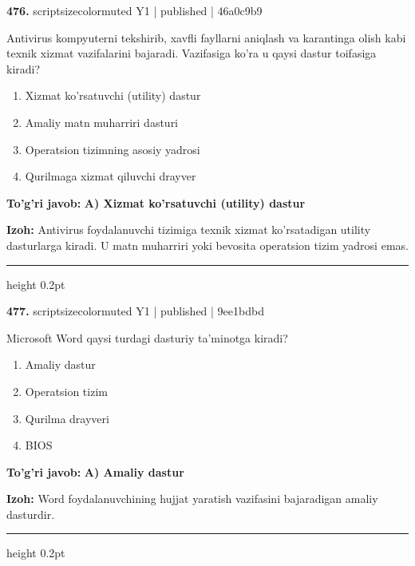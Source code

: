 \documentclass[10pt,a4paper]{article}
\begin{document}
{\bfseries\sffamily\color{ink} 476.} {scriptsizecolor{muted} Y1 | published | 46a0c9b9}
\par
Antivirus kompyuterni tekshirib, xavfli fayllarni aniqlash va karantinga olish kabi texnik xizmat vazifalarini bajaradi. Vazifasiga ko'ra u qaysi dastur toifasiga kiradi?
\begin{enumerate}[label=\Alph*),leftmargin=9mm]
\item Xizmat ko'rsatuvchi (utility) dastur
\item Amaliy matn muharriri dasturi
\item Operatsion tizimning asosiy yadrosi
\item Qurilmaga xizmat qiluvchi drayver
\end{enumerate}
\begin{tcolorbox}[enhanced,breakable,colback=teal!4,colframe=teal!60!black,boxrule=0.45pt,arc=1.2mm,left=2.7mm,right=2.7mm,top=1.8mm,bottom=1.8mm,before skip=2mm,after skip=2mm]
{\bfseries\sffamily\color{teal}To'g'ri javob:} \textbf{A) Xizmat ko'rsatuvchi (utility) dastur}
\par\smallskip
{\bfseries Izoh:} Antivirus foydalanuvchi tizimiga texnik xizmat ko'rsatadigan utility dasturlarga kiradi. U matn muharriri yoki bevosita operatsion tizim yadrosi emas.
\end{tcolorbox}
\vspace{2mm}\hrule height 0.2pt\vspace{3mm}

{\bfseries\sffamily\color{ink} 477.} {scriptsizecolor{muted} Y1 | published | 9ee1bdbd}
\par
Microsoft Word qaysi turdagi dasturiy ta'minotga kiradi?
\begin{enumerate}[label=\Alph*),leftmargin=9mm]
\item Amaliy dastur
\item Operatsion tizim
\item Qurilma drayveri
\item BIOS
\end{enumerate}
\begin{tcolorbox}[enhanced,breakable,colback=teal!4,colframe=teal!60!black,boxrule=0.45pt,arc=1.2mm,left=2.7mm,right=2.7mm,top=1.8mm,bottom=1.8mm,before skip=2mm,after skip=2mm]
{\bfseries\sffamily\color{teal}To'g'ri javob:} \textbf{A) Amaliy dastur}
\par\smallskip
{\bfseries Izoh:} Word foydalanuvchining hujjat yaratish vazifasini bajaradigan amaliy dasturdir.
\end{tcolorbox}
\vspace{2mm}\hrule height 0.2pt\vspace{3mm}
\end{document}
